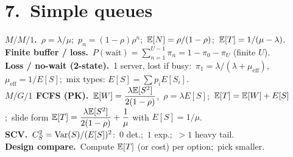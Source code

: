 \section*{7.\ Simple queues}
\textbf{$M/M/1$.}\ $\rho=\lambda/\mu$;\ $p_n=(1-\rho)\rho^n$;\ $\mathbb{E}[N]=\rho/(1-\rho)$;\ $\mathbb{E}[T]=1/(\mu-\lambda)$.\\
\textbf{Finite buffer / loss.}\ $P(\text{wait})=\sum_{n=1}^{U-1}\pi_n=1-\pi_0-\pi_U$ (finite $U$).\\
\textbf{Loss / no-wait (2-state).}\ 1 server, lost if busy:\ $\pi_1=\lambda/(\lambda+\mu_{\mathrm{eff}})$,\ $\mu_{\mathrm{eff}}=1/E[S]$;\ mix types: $E[S]=\sum p_iE[S_i]$.\\
\textbf{$M/G/1$ FCFS (PK).}\ $\mathbb{E}[W]=\dfrac{\lambda\mathbb{E}[S^2]}{2(1-\rho)}$,\ $\rho=\lambda E[S]$;\ $\mathbb{E}[T]=\mathbb{E}[W]+E[S]$;\ slide form $\mathbb{E}[T]=\dfrac{\lambda\mathbb{E}[S^2]}{2(1-\rho)}+\dfrac{1}{\mu}$ with $E[S]=1/\mu$.\\
\textbf{SCV.}\ $C_S^2=\mathrm{Var}(S)/(E[S])^2$:\ $0$ det.;\ $1$ exp.;\ $>1$ heavy tail.\\
\textbf{Design compare.}\ Compute $\mathbb{E}[T]$ (or cost) per option;\ pick smaller.
